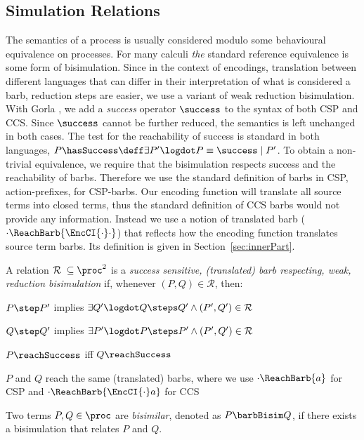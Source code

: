 \documentclass[]{eptcs}
\begin{document}
\subsection{Simulation Relations}

The semantics of a process is usually considered modulo some behavioural equivalence on processes.
For many calculi \emph{the} standard reference equivalence is some form of bisimulation.
Since in the context of encodings, \ie translation between different languages that can differ in their interpretation of what is considered a barb, reduction steps are easier, we use a variant of weak reduction bisimulation.
With Gorla \cite{gorla10}, we add a \emph{success} operator $ \success $ to the syntax of both CSP and CCS. Since $ \success $ cannot be further reduced, the semantics is left unchanged in both cases. The test for the reachability of success is standard in both languages, \ie $ P\hasSuccess \deff \exists P'\logdot P \equiv \success \mid P' $.
To obtain a non-trivial equivalence, we require that the bisimulation respects success and the reachability of barbs.
Therefore we use the standard definition of barbs in CSP, \ie action-prefixes, for CSP-barbs.
Our encoding function will translate all source terms into closed terms, thus the standard definition of CCS barbs would not provide any information.
Instead we use a notion of translated barb ($ \cdot\ReachBarb{\EncCI{\cdot}\cdot} $) that reflects how the encoding function translates source term barbs. Its definition is given in Section~\ref{sec:innerPart}.

\begin{definition}[Bisimulation]
	A relation $ \mathcal{R} \; \subseteq \proc^2 $ is a \emph{success sensitive, (translated) barb respecting, weak, reduction bisimulation} if, whenever $ \left( P, Q \right) \in \mathcal{R} $, then:
	\begin{compactitem}
		\item $ P \step P' $ implies $ \exists Q'\logdot Q \steps Q' \wedge \left( P', Q' \right) \in \mathcal{R} $
		\item $ Q \step Q' $ implies $ \exists P'\logdot P \steps P' \wedge \left( P', Q' \right) \in \mathcal{R} $
		\item $ P\reachSuccess $ iff $ Q\reachSuccess $
		\item $ P $ and $ Q $ reach the same (translated) barbs, where we use $ \cdot\ReachBarb{a} $ for CSP and $ \cdot\ReachBarb{\EncCI{\cdot}a} $ for CCS
	\end{compactitem}
	Two terms $ P, Q \in \proc $ are \emph{bisimilar}, denoted as $ P \barbBisim Q $, if there exists a bisimulation that relates $ P $ and $ Q $.
\end{definition}
\end{document}
